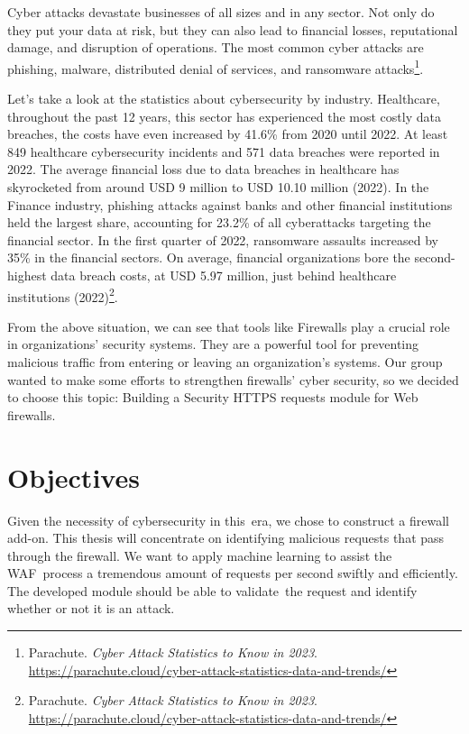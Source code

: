 Cyber attacks devastate businesses of all sizes and in any sector. Not only do they put your data at risk, but they can also lead to financial losses, reputational damage, and disruption of operations. The most common cyber attacks are phishing, malware, distributed denial of services, and ransomware attacks\footnote{Parachute. \textit{Cyber Attack Statistics to Know in 2023}. \url{https://parachute.cloud/cyber-attack-statistics-data-and-trends/}}. 

Let's take a look at the statistics about cybersecurity by industry. Healthcare, throughout the past 12 years, this sector has experienced the most costly data breaches, the costs have even increased by 41.6\% from 2020 until 2022. At least 849 healthcare cybersecurity incidents and 571 data breaches were reported in 2022. The average financial loss due to data breaches in healthcare has skyrocketed from around USD 9 million to USD 10.10 million (2022). In the Finance industry, phishing attacks against banks and other financial institutions held the largest share, accounting for 23.2\% of all cyberattacks targeting the financial sector. In the first quarter of 2022, ransomware assaults increased by 35\% in the financial sectors. On average, financial organizations bore the second-highest data breach costs, at USD 5.97 million, just behind healthcare institutions (2022)\footnote{Parachute. \textit{Cyber Attack Statistics to Know in 2023}. \url{https://parachute.cloud/cyber-attack-statistics-data-and-trends/}}. 

From the above situation, we can see that tools like Firewalls play a crucial role in organizations' security systems. They are a powerful tool for preventing malicious traffic from entering or leaving an organization’s systems. Our group wanted to make some efforts to strengthen firewalls' cyber security, so we decided to choose this topic: Building a Security HTTPS requests module for Web firewalls.
\section{Objectives}
\label{sec:objectives}
Given the necessity of cybersecurity in this era, we chose to construct a firewall add-on. This thesis will concentrate on identifying malicious requests that pass through the firewall. We want to apply machine learning to assist the WAF process a tremendous amount of requests per second swiftly and efficiently. The developed module should be able to validate the request and identify whether or not it is an attack.

